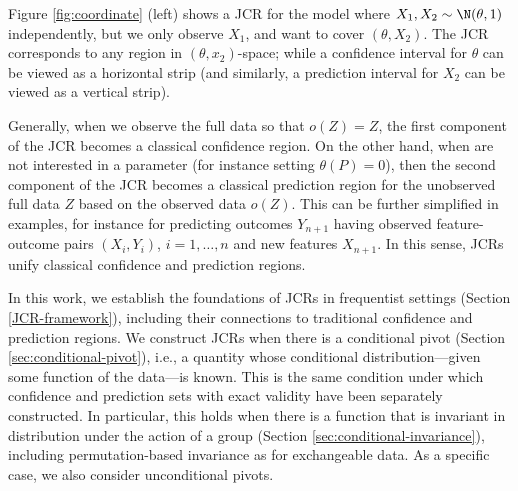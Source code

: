 \documentclass[english]{article}
\begin{document}
Figure \ref{fig:coordinate} (left) shows a JCR
for the model where $X_1,X_2 \sim \N(\theta,1)$ independently, but we only observe $X_1$, and want to cover $(\theta,X_2)$.
The JCR corresponds to any region in $(\theta,x_2)$-space; while a confidence interval for $\theta$ can be viewed as a horizontal strip (and similarly, a prediction interval for $X_2$ can be viewed as a vertical strip).

Generally, when we observe the full data so that $o(Z)=Z$, the first component of the JCR becomes a classical confidence region. 
On the other hand, when are not interested in a parameter (for instance setting $\theta(P)=0$), then the second component of the JCR becomes a classical prediction region for the unobserved full data $Z$ based on the observed data $o(Z)$. 
This can be further simplified in examples, for instance for predicting outcomes $Y_{n+1}$ having observed feature-outcome pairs $(X_i,Y_i)$, $i=1,\ldots, n$ and new features $X_{n+1}$.
In this sense, JCRs unify classical confidence and prediction regions.

In this work, we establish the foundations of JCRs in frequentist settings (Section \ref{JCR-framework}), including their connections to traditional confidence and prediction regions.
We construct JCRs when there is a conditional pivot (Section \ref{sec:conditional-pivot}), i.e., a quantity whose conditional distribution---given some function of the data---is known. 
This is the same condition under which confidence and prediction sets with exact validity have been separately constructed. 
In particular, this holds when there is a function that is invariant in distribution under the action of a group (Section \ref{sec:conditional-invariance}), including permutation-based invariance as for exchangeable data.
As a specific case, we also consider unconditional pivots.

\end{document}
